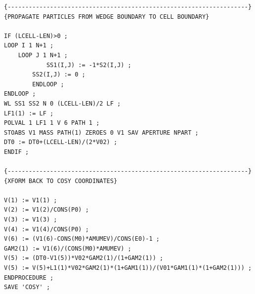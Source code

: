 \begin{lstlisting}
{--------------------------------------------------------------------}
{PROPAGATE PARTICLES FROM WEDGE BOUNDARY TO CELL BOUNDARY}

IF (LCELL-LEN)>0 ;
LOOP I 1 N+1 ; 
    LOOP J 1 N+1 ;
            SS1(I,J) := -1*S2(I,J) ; 
        SS2(I,J) := 0 ;
        ENDLOOP ; 
ENDLOOP ;
WL SS1 SS2 N 0 (LCELL-LEN)/2 LF ; 
LF1(1) := LF ; 
POLVAL 1 LF1 1 V 6 PATH 1 ;
STOABS V1 MASS PATH(1) ZEROES 0 V1 SAV APERTURE NPART ;
DT0 := DT0+(LCELL-LEN)/(2*V02) ;
ENDIF ;

{--------------------------------------------------------------------}
{XFORM BACK TO COSY COORDINATES}

V(1) := V1(1) ; 
V(2) := V1(2)/CONS(P0) ; 
V(3) := V1(3) ; 
V(4) := V1(4)/CONS(P0) ; 
V(6) := (V1(6)-CONS(M0)*AMUMEV)/CONS(E0)-1 ;
GAM2(1) := V1(6)/(CONS(M0)*AMUMEV) ;
V(5) := (DT0-V1(5))*V02*GAM2(1)/(1+GAM2(1)) ;
V(5) := V(5)+L1(1)*V02*GAM2(1)*(1+GAM1(1))/(V01*GAM1(1)*(1+GAM2(1))) ;
ENDPROCEDURE ;
SAVE 'COSY' ;

\end{lstlisting}

